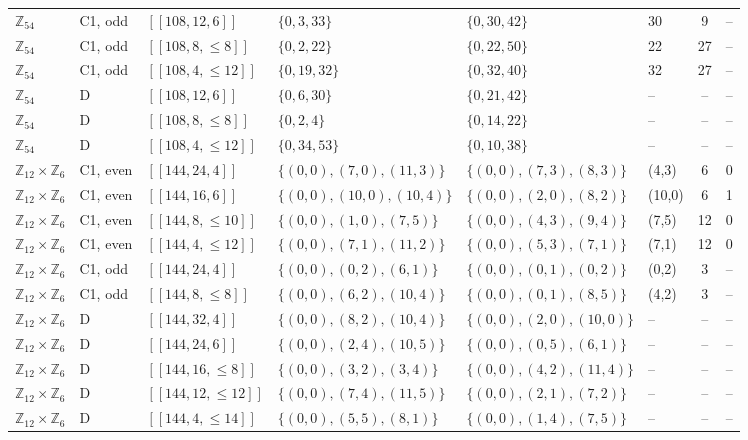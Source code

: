 \documentclass[reprint,twocolumn,superscriptaddress,nofootinbib]{revtex4-2}
\theoremstyle{plain}
\begin{document}
\begin{table}[!t]
\begin{ruledtabular}
\begin{tabular}{llllllcc}
$\mathbb{Z}_{54}$ & C1, odd & $[[108,12,6]]$ & $\{0,3,33\}$ & $\{0,30,42\}$ & 30 & 9 & -- \\
$\mathbb{Z}_{54}$ & C1, odd & $[[108,8,\le8]]$ & $\{0,2,22\}$ & $\{0,22,50\}$ & 22 & 27 & -- \\
$\mathbb{Z}_{54}$ & C1, odd & $[[108,4,\le12]]$ & $\{0,19,32\}$ & $\{0,32,40\}$ & 32 & 27 & -- \\
$\mathbb{Z}_{54}$ & D & $[[108,12,6]]$ & $\{0,6,30\}$ & $\{0,21,42\}$ & -- & -- & -- \\
$\mathbb{Z}_{54}$ & D & $[[108,8,\le8]]$ & $\{0,2,4\}$ & $\{0,14,22\}$ & -- & -- & -- \\
$\mathbb{Z}_{54}$ & D & $[[108,4,\le12]]$ & $\{0,34,53\}$ & $\{0,10,38\}$ & -- & -- & -- \\
$\mathbb{Z}_{12}\times\mathbb{Z}_{6}$ & C1, even & $[[144,24,4]]$ & $\{(0,0),(7,0),(11,3)\}$ & $\{(0,0),(7,3),(8,3)\}$ & (4,3) & 6 & 0 \\
$\mathbb{Z}_{12}\times\mathbb{Z}_{6}$ & C1, even & $[[144,16,6]]$ & $\{(0,0),(10,0),(10,4)\}$ & $\{(0,0),(2,0),(8,2)\}$ & (10,0) & 6 & 1 \\
$\mathbb{Z}_{12}\times\mathbb{Z}_{6}$ & C1, even & $[[144,8,\le10]]$ & $\{(0,0),(1,0),(7,5)\}$ & $\{(0,0),(4,3),(9,4)\}$ & (7,5) & 12 & 0 \\
$\mathbb{Z}_{12}\times\mathbb{Z}_{6}$ & C1, even & $[[144,4,\le12]]$ & $\{(0,0),(7,1),(11,2)\}$ & $\{(0,0),(5,3),(7,1)\}$ & (7,1) & 12 & 0 \\
$\mathbb{Z}_{12}\times\mathbb{Z}_{6}$ & C1, odd & $[[144,24,4]]$ & $\{(0,0),(0,2),(6,1)\}$ & $\{(0,0),(0,1),(0,2)\}$ & (0,2) & 3 & -- \\
$\mathbb{Z}_{12}\times\mathbb{Z}_{6}$ & C1, odd & $[[144,8,\le8]]$ & $\{(0,0),(6,2),(10,4)\}$ & $\{(0,0),(0,1),(8,5)\}$ & (4,2) & 3 & -- \\
$\mathbb{Z}_{12}\times\mathbb{Z}_{6}$ & D & $[[144,32,4]]$ & $\{(0,0),(8,2),(10,4)\}$ & $\{(0,0),(2,0),(10,0)\}$ & -- & -- & -- \\
$\mathbb{Z}_{12}\times\mathbb{Z}_{6}$ & D & $[[144,24,6]]$ & $\{(0,0),(2,4),(10,5)\}$ & $\{(0,0),(0,5),(6,1)\}$ & -- & -- & -- \\
$\mathbb{Z}_{12}\times\mathbb{Z}_{6}$ & D & $[[144,16,\le8]]$ & $\{(0,0),(3,2),(3,4)\}$ & $\{(0,0),(4,2),(11,4)\}$ & -- & -- & -- \\
$\mathbb{Z}_{12}\times\mathbb{Z}_{6}$ & D & $[[144,12,\le12]]$ & $\{(0,0),(7,4),(11,5)\}$ & $\{(0,0),(2,1),(7,2)\}$ & -- & -- & -- \\
$\mathbb{Z}_{12}\times\mathbb{Z}_{6}$ & D & $[[144,4,\le14]]$ & $\{(0,0),(5,5),(8,1)\}$ & $\{(0,0),(1,4),(7,5)\}$ & -- & -- & -- \\

\end{tabular}
\end{ruledtabular}
\end{table}
\end{document}
